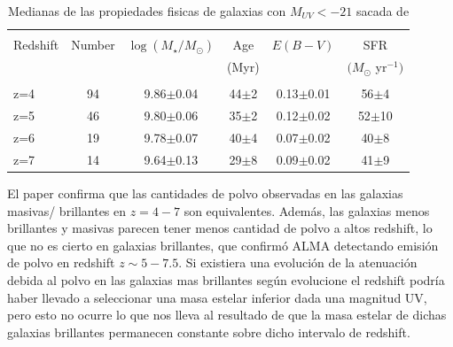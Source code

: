 \documentclass{article}
\begin{document}
\begin{table}[h]
\begin{center}
\begin{tabular}{lccccc}
\hline \hline\\
Redshift & Number & $\log(M_\star/M_\odot)$ & Age & $E(B-V)$ & SFR\\
	&	&	&	(Myr)	&	& $(M_\odot$ yr$^{-1})$\\
\hline\\
z=4 & 94 & 9.86$\pm$0.04 & 44$\pm$2 & 0.13$\pm$0.01 & 56$\pm$4\\
z=5 & 46 & 9.80$\pm$0.06 & 35$\pm$2 & 0.12$\pm$0.02 & 52$\pm$10\\
z=6 & 19 & 9.78$\pm$0.07 & 40$\pm$4 & 0.07$\pm$0.02 & 40$\pm$8\\
z=7 & 14 & 9.64$\pm$0.13 & 29$\pm$8 & 0.09$\pm$0.02 & 41$\pm$9\\
\hline
\end{tabular}
\caption{\label{tab:finkelstein1} Medianas de las propiedades fisicas de galaxias con $M_{UV}<-21$ sacada de \cite{finkelstein2015increasing}}
\end{center}
\end{table}

El paper \cite{finkelstein2015increasing} confirma que las cantidades de polvo observadas en las galaxias masivas/ brillantes en $z=4-7$ son equivalentes. Además, las galaxias menos brillantes y masivas parecen tener menos cantidad de polvo a altos redshift, lo que no es cierto en galaxias brillantes, que confirmó ALMA detectando emisión de polvo en redshift $z\sim 5-7.5$. Si existiera una evolución de la atenuación debida al polvo en las galaxias mas brillantes según evolucione el redshift  podría haber llevado a seleccionar una masa estelar inferior dada una magnitud UV, pero esto no ocurre lo que nos lleva al resultado de que la masa estelar de dichas galaxias brillantes permanecen constante sobre dicho intervalo de redshift. \\
\end{document}
